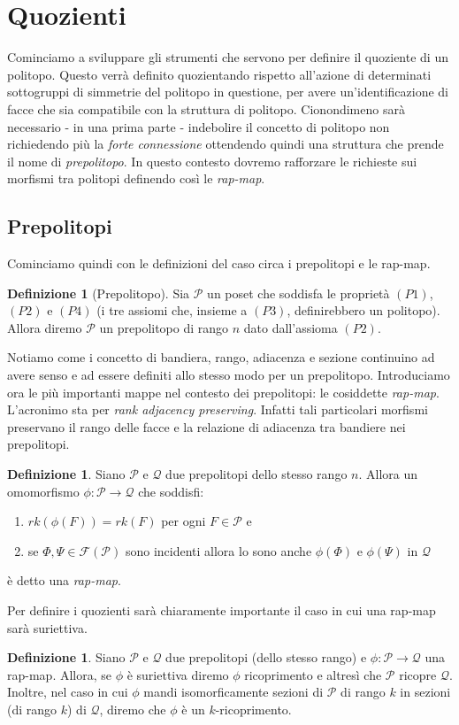 \documentclass[a4paper,12pt]{report}
\newcommand{\p}{\mathcal{P}}
\theoremstyle{plain}
\theoremstyle{definition}
\newtheorem{defin}[teo]{Definizione}
\newcommand\flag[1]{\mathcal{F}(#1)}
\begin{document}
\section{Quozienti}
Cominciamo a sviluppare gli strumenti che servono per definire il quoziente di un politopo. Questo verr\`a definito quozientando rispetto all'azione di
determinati sottogruppi di simmetrie del politopo in questione, per avere un'identificazione di facce che sia compatibile con la struttura di politopo.
Cionondimeno sar\`a necessario - in una prima parte - indebolire il concetto di politopo non richiedendo pi\`u la \emph{forte connessione} ottendendo
quindi una struttura che prende il nome di \emph{prepolitopo}. In questo contesto dovremo rafforzare le richieste sui morfismi tra politopi
definendo cos\`i le \emph{rap-map}.
\subsection{Prepolitopi}
Cominciamo quindi con le definizioni del caso circa i prepolitopi e le rap-map.
\begin{defin}[Prepolitopo]
Sia $\p$ un poset che soddisfa le propriet\`a $(P1)$, $(P2)$ e $(P4)$ (i tre assiomi che, insieme a $(P3)$, definirebbero un politopo). Allora diremo
$\p$ un prepolitopo di rango $n$ dato dall'assioma $(P2)$.
\end{defin}
Notiamo come i concetto di bandiera, rango, adiacenza e sezione continuino ad avere senso e ad essere definiti allo stesso modo per un prepolitopo.
Introduciamo ora le pi\`u importanti mappe nel contesto dei prepolitopi: le cosiddette \emph{rap-map}. L'acronimo sta per \emph{rank adjacency preserving}.
Infatti tali particolari morfismi preservano il rango delle facce e la relazione di adiacenza tra bandiere nei prepolitopi.
\begin{defin}
Siano $\p$ e $\mathcal{Q}$ due prepolitopi dello stesso rango $n$. Allora un omomorfismo $\phi:\p\longrightarrow\mathcal{Q}$ che soddisfi:
\begin{enumerate}
\item $rk(\phi(F))=rk(F)$ per ogni $F\in\p$ e
\item se $\Phi,\Psi\in\flag{\p}$ sono incidenti allora lo sono anche $\phi(\Phi)$ e $\phi(\Psi)$ in $\mathcal{Q}$
\end{enumerate}
\`e detto una \emph{rap-map}.
\end{defin}
Per definire i quozienti sar\`a chiaramente importante il caso in cui una rap-map sar\`a suriettiva.
\begin{defin}
Siano $\p$ e $\mathcal{Q}$ due prepolitopi (dello stesso rango) e $\phi:\p\longrightarrow\mathcal{Q}$ una rap-map. Allora, se $\phi$ \`e suriettiva
diremo $\phi$ ricoprimento e altres\`i che $\p$ ricopre $\mathcal{Q}$.\\
Inoltre, nel caso in cui $\phi$ mandi isomorficamente sezioni di $\p$ di rango $k$ in sezioni (di rango $k$) di $\mathcal{Q}$, diremo che
$\phi$ \`e un $k$-ricoprimento.
\end{defin}
\end{document}

